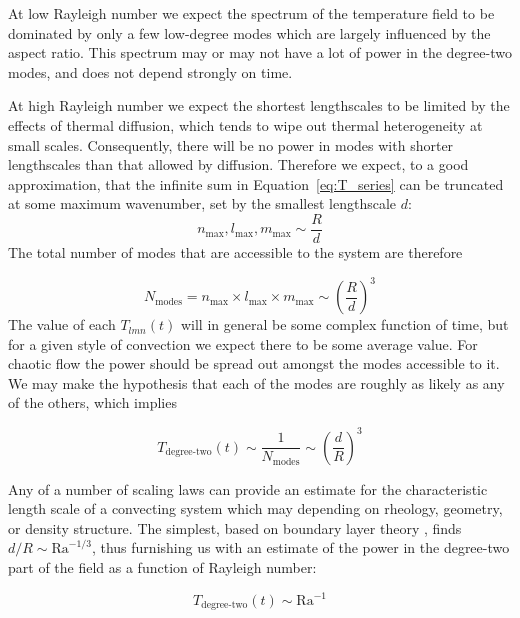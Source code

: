 \documentclass[extra,mreferee]{gji}
\begin{document}
At low Rayleigh number we expect the spectrum of the temperature field to be dominated by only a few low-degree modes which are largely influenced by the aspect ratio.
This spectrum may or may not have a lot of power in the degree-two modes, and does not depend strongly on time.

At high Rayleigh number we expect the shortest lengthscales to be limited by the effects of thermal diffusion,
which tends to wipe out thermal heterogeneity at small scales.  Consequently, there will be no power in modes
with shorter lengthscales than that allowed by diffusion. 
Therefore we expect, to a good approximation, that the infinite sum in Equation~\eqref{eq:T_series} can be truncated at some maximum wavenumber, set by the smallest lengthscale $d$:
\begin{equation}
n_{\text{max}}, l_{\text{max}}, m_{\text{max}} \sim \frac{R}{d}
\end{equation}
The total number of modes that are accessible to the system are therefore 

\begin{equation}
N_{\text{modes}} = n_{\text{max}} \times l_{\text{max}} \times m_{\text{max}} \sim \left( \frac{R}{d} \right)^{3}
\end{equation}
The value of each $T_{lmn}(t)$ will in general be some complex function of time, but for a given style of convection we expect there to be some average value.
For chaotic flow the power should be spread out amongst the modes accessible to it.
We may make the hypothesis that each of the modes are roughly as likely as any of the others, which implies

\begin{equation}
T_{\text{degree-two}}(t) \sim \frac{1}{N_{\text{modes}}} \sim \left( \frac{d}{R}\right)^3
\end{equation}

Any of a number of scaling laws can provide an estimate for the characteristic length scale of a convecting system which may depending on rheology, geometry, or density structure.
The simplest, based on boundary layer theory \citep{turcotte1967finite}, finds $d/R \sim \mathrm{Ra}^{-1/3}$, thus furnishing us with an estimate of the power in the degree-two part of the field as a function of Rayleigh number:

\begin{equation}
T_{\text{degree-two}}(t) \sim \mathrm{Ra}^{-1}
\label{eq:degree_two_of_ra}
\end{equation}
\end{document}
